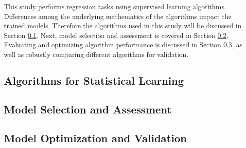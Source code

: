 This study performs regression tasks using supervised learning algorithms.
Differences among the underlying mathematics of the algorithms impact the
trained models.  Therefore the algorithms used in this study will be discussed
in Section \ref{sec:algs}. Next, model selection and assessment is covered in
Section \ref{sec:selectass}.  Evaluating and optimizing algorithm performance
is discussed in Section \ref{sec:optvalid}, as well as robustly comparing
different algorithms for validation.

\subsection{Algorithms for Statistical Learning}
\label{sec:algs}


\subsection{Model Selection and Assessment}
\label{sec:selectass}


\subsection{Model Optimization and Validation}
\label{sec:optvalid}

